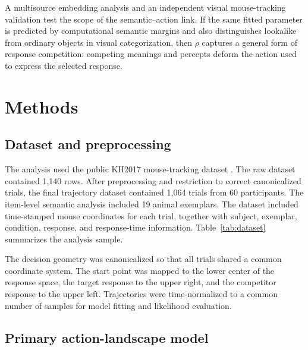 \documentclass[11pt,final]{article}
\begin{document}
A multisource embedding analysis and an independent visual mouse-tracking validation test the scope of the semantic--action link. If the same fitted parameter is predicted by computational semantic margins and also distinguishes lookalike from ordinary objects in visual categorization, then $\rho$ captures a general form of response competition: competing meanings and percepts deform the action used to express the selected response.

\section{Methods}

\subsection{Dataset and preprocessing}

The analysis used the public KH2017 mouse-tracking dataset \citep{kh2017raw}. The raw dataset contained 1,140 rows. After preprocessing and restriction to correct canonicalized trials, the final trajectory dataset contained 1,064 trials from 60 participants. The item-level semantic analysis included 19 animal exemplars. The dataset included time-stamped mouse coordinates for each trial, together with subject, exemplar, condition, response, and response-time information. Table~\ref{tab:dataset} summarizes the analysis sample.



The decision geometry was canonicalized so that all trials shared a common coordinate system. The start point was mapped to the lower center of the response space, the target response to the upper right, and the competitor response to the upper left. Trajectories were time-normalized to a common number of samples for model fitting and likelihood evaluation.

\subsection{Primary action-landscape model}
\end{document}
